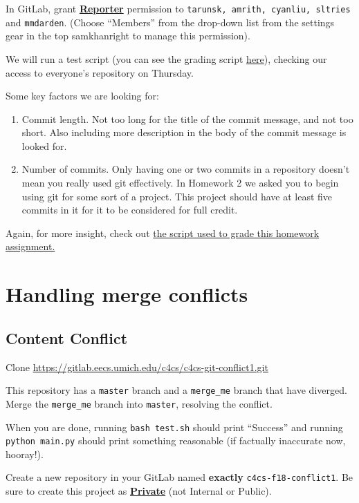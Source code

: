 \documentclass{article}
\begin{document}
In GitLab, grant \textbf{\ul{Reporter}} permission to \texttt{tarunsk, amrith, 
cyanliu, sltries} and \texttt{mmdarden}. (Choose ``Members'' from the drop-down 
list from the settings gear in the top samkhanright to manage this permission).

We will run a test script (you can see the grading script
\href{https://github.com/c4cs/autograders/tree/master/git-II}{here}), checking 
our access to everyone's repository on Thursday.

Some key factors we are looking for:
\begin{enumerate}
    \item Commit length. Not too long for the title of the commit message, and
        not too short. Also including more description in the body of the commit
        message is looked for.

    \item Number of commits. Only having one or two commits in a repository
        doesn't mean you really used git effectively. In Homework 2 we asked you
        to begin using git for some sort of a project. This project should have
        at least five commits in it for it to be considered for full credit.
\end{enumerate}

Again, for more insight, check out
\href{https://github.com/c4cs/autograders/tree/master/git-II}{the script used to 
grade this homework assignment.}

\newpage
\section{Handling merge conflicts}

\subsection{Content Conflict}

Clone \url{https://gitlab.eecs.umich.edu/c4cs/c4cs-git-conflict1.git}

This repository has a \texttt{master} branch and a \texttt{merge\_me} branch
that have diverged. Merge the \texttt{merge\_me} branch into \texttt{master},
resolving the conflict.

When you are done, running \texttt{bash test.sh} should print ``Success'' and
running \texttt{python main.py} should print something reasonable (if
factually inaccurate now, hooray!).

Create a new repository in your GitLab named \textbf{exactly}
\texttt{c4cs-f18-conflict1}.
Be sure to create this project as
\textbf{\ul{Private}} (not Internal or Public).
\end{document}
